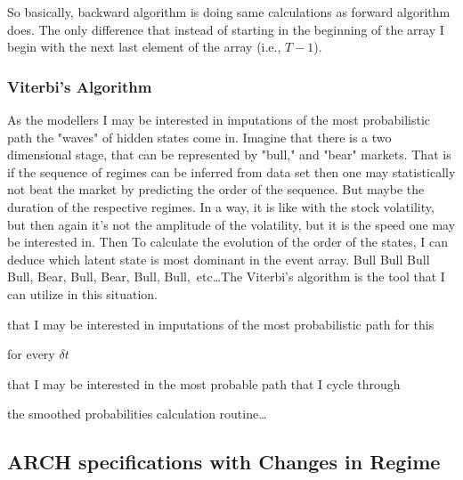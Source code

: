 \documentclass[a4paper,11pt,english]{article}
\begin{document}
			So basically, backward algorithm is doing same calculations as forward algorithm does. The only difference that instead of starting in the 
			beginning of the array I begin with the next last element of the array (i.e., $T-1$).
		

			\subsubsection{Viterbi's Algorithm}
				
			As the modellers I may be interested in imputations of the most probabilistic path the "waves"  of hidden states come in. Imagine that there 
			is a two dimensional stage, that can be represented by "bull," and "bear" markets. That is if the sequence of regimes can be inferred from data 
			set then one may statistically not beat the market by predicting the order of the sequence. But maybe the duration of the respective regimes. 
			In a way, it is like with the stock volatility, but then again it's not the amplitude of the volatility, but it is the speed one may be 
			interested in. Then To calculate the evolution of the order of the states, I can deduce which latent state is most dominant in the event 
			array. Bull Bull Bull Bull, Bear, Bull, Bear, Bull, Bull,~etc\ldots The Viterbi's algorithm is the tool that I can utilize in this situation.
		
			that I may be interested in imputations of the most probabilistic path for this 
		
			for every $\delta t$
		
			that I may be interested in the most probable path 
			that I cycle through
			
			
			the smoothed probabilities calculation routine\ldots 
			
			
		\subsection{ARCH specifications with Changes in Regime}
		
\end{document}
